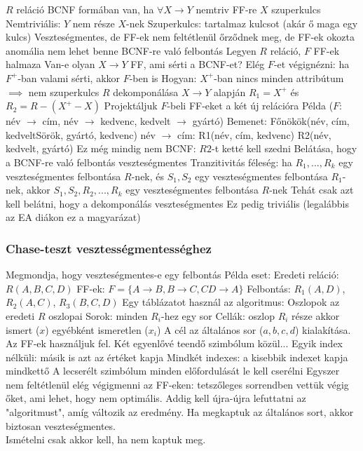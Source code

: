 \documentclass[12pt,a4paper]{article}
\begin{document}
\begin{outline}
	\1 $R$ reláció BCNF formában van, ha $\forall X \to Y$ nemtriv FF-re $X$ szuperkulcs
		\2 Nemtriviális: $Y$ nem része $X$-nek
		\2 Szuperkulcs: tartalmaz kulcsot (akár ő maga egy kulcs)
	\1 Veszteségmentes, de FF-ek nem feltétlenül őrződnek meg, de FF-ek okozta anomália nem lehet benne
	\1 BCNF-re való felbontás
		\2 Legyen $R$ reláció, $F$ FF-ek halmaza
		\2 Van-e olyan $X \to Y$ FF, ami sérti a BCNF-et?
			\3 Elég $F$-et végignézni: ha $F^+$-ban valami sérti, akkor $F$-ben is
			\3 Hogyan: $X^+$-ban nincs minden attribútum $\implies$ nem szuperkulcs
		\2 $R$ dekomponálása $X \to Y$ alapján
			\3 $R_1 = X^+$ és $R_2 = R - (X^+ - X)$
			\3 Projektáljuk $F$-beli FF-eket a két új relációra
			\3 Példa ($F$: név $\to$ cím, név $\to$ kedvenc, kedvelt $\to$ gyártó)
				\4 Bemenet: Főnökök(név, cím, kedveltSörök, gyártó, kedvenc)
				\4 név $\to$ cím: R1(név, cím, kedvenc) R2(név, kedvelt, gyártó)
				\4 Ez még mindig nem BCNF: $R2$-t ketté kell szedni
	\1 Belátása, hogy a BCNF-re való felbontás veszteségmentes
		\2 Tranzitivitás féleség: ha $R_1,...,R_k$ egy veszteségmentes felbontása $R$-nek,
		és $S_1,S_2$ egy veszteségmentes felbontása $R_1$-nek,
		akkor $S_1,S_2,R_2,...,R_k$ egy veszteségmentes felbontása $R$-nek
		\2 Tehát csak azt kell belátni, hogy a dekomponálás veszteségmentes
		\2 Ez pedig triviális (legalábbis az EA diákon ez a magyarázat)
\end{outline}

\pagebreak

\subsubsection{Chase-teszt vesztességmentességhez}

\begin{outline}
	\1 Megmondja, hogy veszteségmentes-e egy felbontás
	\1 Példa eset:
		\2 Eredeti reláció: $R(A,B,C,D)$
		\2 FF-ek: $F = \{A \to B, B \to C, CD \to A\}$
		\2 Felbontás: $R_1(A,D)$, $R_2(A,C)$, $R_3(B,C,D)$
	\1 Egy táblázatot használ az algoritmus:
		\2 Oszlopok az eredeti $R$ oszlopai
		\2 Sorok: minden $R_i$-hez egy sor
		\2 Cellák: oszlop $R_i$ része akkor ismert ($x$) egyébként ismeretlen ($x_i$)
	\1 A cél az általános sor ($a,b,c,d$) kialakítása. Az FF-ek használjuk fel.
		\2 Két egyenlővé teendő szimbólum közül...
			\3 Egyik index nélküli: másik is azt az értéket kapja
			\3 Mindkét indexes: a kisebbik indexet kapja mindkettő
		\2 A lecserélt szimbólum minden előfordulását le kell cserélni
	\1 Egyszer nem feltétlenül elég végigmenni az FF-eken: tetszőleges sorrendben vettük végig őket, ami lehet, hogy nem optimális. Addig kell újra-újra lefuttatni az "algoritmust", amíg változik az eredmény.
		\2 Ha megkaptuk az általános sort, akkor biztosan veszteségmentes.\\
		Ismételni csak akkor kell, ha nem kaptuk meg.
\end{outline}
\end{document}
